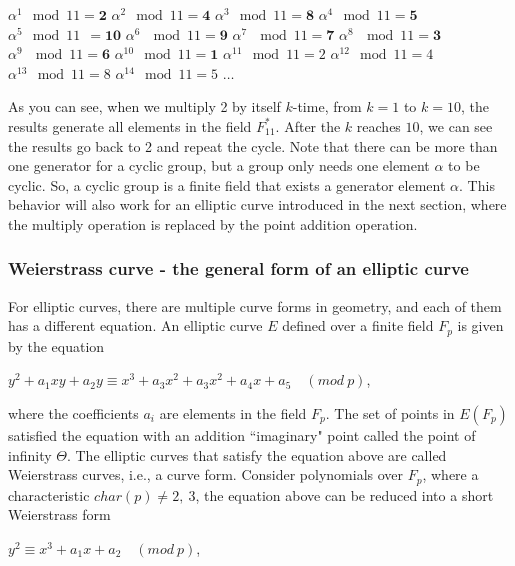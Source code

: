 \setlength{\columnsep}{3cm}
\begin{multicols}{3}
  $\alpha^1 \mod 11 = \mathbf{2}$
  $\alpha^2 \mod 11 = \mathbf{4}$
  $\alpha^3 \mod 11 = \mathbf{8}$
  $\alpha^4 \mod 11 = \mathbf{5}$
  $\alpha^5 \mod 11 \ \ = \mathbf{10}$
  $\alpha^6 \ \mod 11 = \mathbf{9}$
  $\alpha^7 \ \mod 11 = \mathbf{7}$
  $\alpha^8 \ \mod 11 = \mathbf{3}$
  $\alpha^9 \ \mod 11 = \mathbf{6}$
  $\alpha^{10} \mod 11 = \mathbf{1}$
  $\alpha^{11} \mod 11 = 2$
  $\alpha^{12} \mod 11 = 4$
  $\alpha^{13} \mod 11 = 8$
  $\alpha^{14} \mod 11 = 5$
  $\dotso$
\end{multicols}


As you can see, when we multiply 2 by itself $k$-time, from $k = 1$ to $k = 10$, the results generate all elements in the field $F_{11}^*$. After the $k$ reaches $10$, we can see the results go back to 2 and repeat the cycle. Note that there can be more than one generator for a cyclic group, but a group only needs one element $\alpha$ to be cyclic. So, a cyclic group is a finite field that exists a generator element $\alpha$. This behavior will also work for an elliptic curve introduced in the next section, where the multiply operation is replaced by the point addition operation.

\subsubsection{Weierstrass curve - the general form of an elliptic curve}
For elliptic curves, there are multiple curve forms in geometry, and each of them has a different equation. An elliptic curve $E$ defined over a finite field $F_p$ is given by the equation


\begin{center}
  $y^2 + a_1xy + a_2y \equiv x^3 + a_3x^2 + a_3x^2 + a_4x + a_5 \quad (mod \ p)$,\\
\end{center}


where the coefficients $a_i$ are elements in the field $F_p$. The set of points in $E(F_p)$ satisfied the equation with an addition ``imaginary" point called the point of infinity $\Theta$. The elliptic curves that satisfy the equation above are called Weierstrass curves, i.e., a curve form. Consider polynomials over $F_p$, where a characteristic $char(p) \neq 2, \ 3$, the equation above can be reduced into a short Weierstrass form


\begin{center}
  $y^2 \equiv x^3 + a_1x + a_2 \quad (mod \ p)$,
\end{center}


